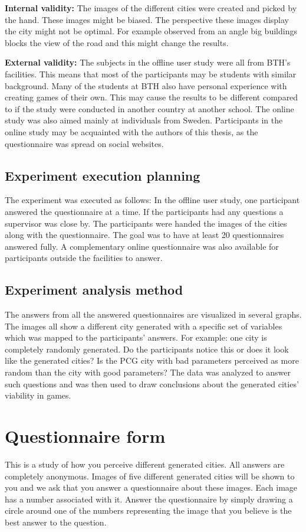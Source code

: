 	\par
	\textbf{Internal validity:} The images of the different cities were created and picked by the hand. These images might be biased. The perspective these images display the city might not be optimal. For example observed from an angle big buildings blocks the view of the road and this might change the results.
	
	\par
	\textbf{External validity:} The subjects in the offline user study were all from BTH's facilities. This means that most of the participants may be students with similar background. Many of the students at BTH also have personal experience with creating games of their own. This may cause the results to be different compared to if the study were conducted in another country at another school. The online study was also aimed mainly at individuals from Sweden. Participants in the online study may be acquainted with the authors of this thesis, as the questionnaire was spread on social websites.
	
	\subsection{Experiment execution planning}
	The experiment was executed as follows: In the offline user study, one participant answered the questionnaire at a time. If the participants had any questions a supervisor was close by. The participants were handed the images of the cities along with the questionnaire. The goal was to have at least 20 questionnaires answered fully. A complementary online questionnaire was also available for participants outside the facilities to answer.
		
	\subsection{Experiment analysis method}
	The answers from all the answered questionnaires are visualized in several graphs. The images all show a different city generated with a specific set of variables which was mapped to the participants' answers. For example: one city is completely randomly generated. Do the participants notice this or does it look like the generated cities? Is the PCG city with bad parameters perceived as more random than the city with good parameters? The data was analyzed to answer such questions and was then used to draw conclusions about the generated cities' viability in games.
	
	\newpage
	\section{Questionnaire form} \label{ssssec:questionnaire}
	This is a study of how you perceive different generated cities. All answers are completely anonymous. Images of five different generated cities will be shown to you and we ask that you answer a questionnaire about these images. Each image has a number associated with it. Answer the questionnaire by simply drawing a circle around one of the numbers representing the image that you believe is the best answer to the question.
			
